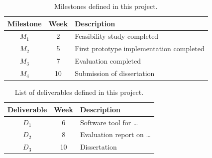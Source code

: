 \documentclass[a4paper,11pt]{article}
\begin{document}
\begin{table}[htbp]
    \begin{center}
        \begin{tabular}{|c|c|l|}
        \hline
        \textbf{Milestone} & \textbf{Week} & \textbf{Description} \\
        \hline
        $M_1$ & 2 & Feasibility study completed \\
        $M_2$ & 5 & First prototype implementation completed \\
        $M_3$ & 7 & Evaluation completed \\
        $M_4$ & 10 & Submission of dissertation \\
        \hline
        \end{tabular} 
    \end{center}
    \caption{Milestones defined in this project.}
    \label{fig:milestones}
\end{table}

\begin{table}[htbp]
    \begin{center}
        \begin{tabular}{|c|c|l|}
        \hline
        \textbf{Deliverable} & \textbf{Week} & \textbf{Description} \\
        \hline
        $D_1$ & 6 & Software tool for \dots\\
        $D_2$ & 8 & Evaluation report on \dots\\
        $D_3$ & 10 & Dissertation \\
        \hline
        \end{tabular} 
    \end{center}
    \caption{List of deliverables defined in this project.}
    \label{fig:deliverables}
\end{table}




\end{document}
